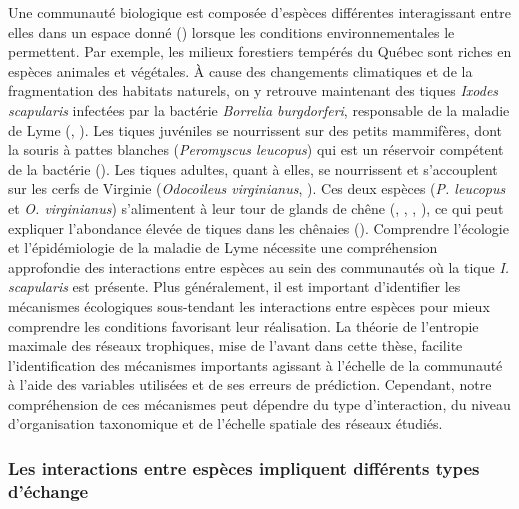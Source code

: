 Une communauté biologique est composée d'espèces différentes interagissant entre
elles dans un espace donné (\cite{Stroud2015Community}) lorsque les conditions
environnementales le permettent. Par exemple, les milieux forestiers tempérés du
Québec sont riches en espèces animales et végétales. À cause des changements
climatiques et de la fragmentation des habitats naturels, on y retrouve
maintenant des tiques \textit{Ixodes scapularis} infectées par la bactérie
\textit{Borrelia burgdorferi}, responsable de la maladie de Lyme
(\cite{Ogden2009Emergence}, \cite{Simon2014Climate}). Les tiques juvéniles se
nourrissent sur des petits mammifères, dont la souris à pattes blanches
(\textit{Peromyscus leucopus}) qui est un réservoir compétent de la bactérie
(\cite{Donahue1987Reservoir}). Les tiques adultes, quant à elles, se nourrissent
et s'accouplent sur les cerfs de Virginie (\textit{Odocoileus virginianus},
\cite{Lane1991Lyme}). Ces deux espèces (\textit{P. leucopus} et \textit{O.
virginianus}) s'alimentent à leur tour de glands de chêne
(\cite{McShea1993Variablea}, \cite{Elkinton1996Interactions},
\cite{Wolff1996Population}, \cite{McShea2000Influence}), ce qui peut expliquer
l'abondance élevée de tiques dans les chênaies (\cite{Ostfeld2006Climate}).
Comprendre l'écologie et l'épidémiologie de la maladie de Lyme nécessite une
compréhension approfondie des interactions entre espèces au sein des communautés
où la tique \textit{I. scapularis} est présente. Plus généralement, il est
important d'identifier les mécanismes écologiques sous-tendant les interactions
entre espèces pour mieux comprendre les conditions favorisant leur réalisation.
La théorie de l'entropie maximale des réseaux trophiques, mise de l'avant dans
cette thèse, facilite l'identification des mécanismes importants agissant à
l'échelle de la communauté à l'aide des variables utilisées et de ses erreurs de
prédiction. Cependant, notre compréhension de ces mécanismes peut dépendre du
type d'interaction, du niveau d'organisation taxonomique et de l'échelle
spatiale des réseaux étudiés. 

\subsubsection{Les interactions entre espèces impliquent différents types d'échange} 

